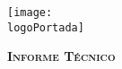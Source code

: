 \documentclass[a4paper]{article} %
\newcommand{\logoPortada}{Mantis.jpg}
\begin{document}
	\begin{titlepage}
	\centering
	\texttt{[image: \\logoPortada]}\par
	\vspace{1cm}
		{\scshape\LARGE \textbf{Informe Técnico}}
	\end{titlepage}
\end{document}
